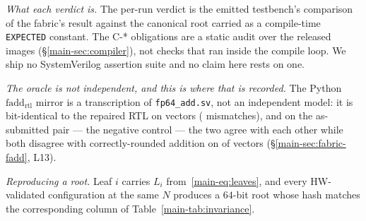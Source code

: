 \documentclass[journal,10pt]{IEEEtran}
\theoremstyle{plain}
\theoremstyle{definition}
\theoremstyle{remark}
\newcommand{\fadd}{\ensuremath{\mathrm{fadd}_{\mathrm{rtl}}}}
\newcommand{\sv}[1]{\texttt{#1}}
\begin{document}
\emph{What each verdict is.} The per-run verdict is the emitted testbench's
comparison of the fabric's result against the canonical root carried as a
compile-time \sv{EXPECTED} constant. The \textsf{C-*} obligations are a
static audit over the released images (\S\ref{main-sec:compiler}), not checks that
ran inside the compile loop. We ship no SystemVerilog assertion suite and no
claim here rests on one.

\emph{The oracle is not independent, and this is where that is recorded.}
The Python $\fadd$ mirror is a transcription of \sv{fp64\_add.sv}, not an
independent model: it is bit-identical to the repaired RTL on
\FpAcceptVectors{} vectors (\FpAcceptMismatch{} mismatches), and on the
as-submitted pair --- the negative control --- the two agree with each other
while both disagree with correctly-rounded addition on \FpCtrlErrors{} of
\FpCtrlVectors{} vectors (\S\ref{main-sec:fabric-fadd}, L13).

\emph{Reproducing a root.} Leaf $i$ carries $L_i$ from~\eqref{main-eq:leaves}, and
every HW-validated configuration at the same $N$ produces a $64$-bit root
whose hash matches the corresponding column of Table~\ref{main-tab:invariance}.



\end{document}
